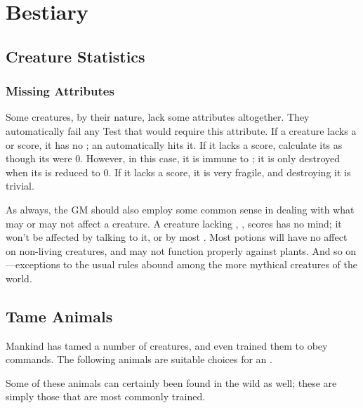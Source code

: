 \chapter{Bestiary}

\section{Creature Statistics}

\subsection{Missing Attributes}

Some creatures, by their nature, lack some attributes altogether.
They automatically fail any Test that would require this attribute.
If a creature lacks a  or  score, it has no ; an  automatically hits it.
If it lacks a  score, calculate its  as though its  were 0.
However, in this case, it is immune to {\shock}; it is only destroyed when its  is reduced to 0.
If it lacks a  score, it is very fragile, and destroying it is trivial.

As always, the GM should also employ some common sense in dealing with what may or may not affect a creature.
A creature lacking , ,  scores has no mind; it won't be affected by talking to it, or by most .
Most potions will have no affect on non-living creatures, and may not function properly against plants.
And so on---exceptions to the usual rules abound among the more mythical creatures of the world.

\section{Tame Animals}

Mankind has tamed a number of creatures, and even trained them to obey commands.
The following animals are suitable choices for an .

Some of these animals can certainly been found in the wild as well; these are simply those that are most commonly trained.


